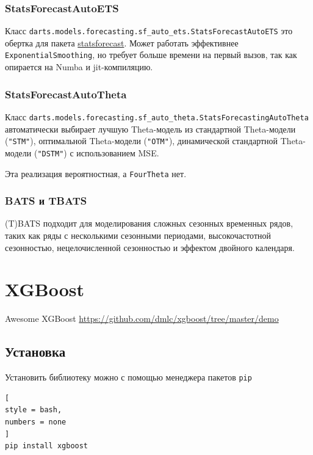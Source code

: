 \documentclass[%
	11pt,
	a4paper,
	utf8,
		]{article}
\begin{document}
\subsubsection{StatsForecastAutoETS}

Класс \verb|darts.models.forecasting.sf_auto_ets.StatsForecastAutoETS| это обертка для пакета \href{https://github.com/Nixtla/statsforecast}{statsforecast}. Может работать эффективнее \verb|ExponentialSmoothing|, но требует больше времени на первый вызов, так как опирается на Numba и jit-компиляцию.

\subsubsection{StatsForecastAutoTheta}

Класс \verb|darts.models.forecasting.sf_auto_theta.StatsForecastingAutoTheta| автоматически выбирает лучшую Theta-модель из стандартной Theta-модели (\verb|"STM"|), оптимальной Theta-модели (\verb|"OTM"|), динамической стандартной Theta-модели (\verb|"DSTM"|) с использованием MSE.

Эта реализация вероятностная, а \verb|FourTheta| нет.

\subsubsection{BATS и TBATS}

(T)BATS подходит для моделирования сложных сезонных временных рядов, таких как ряды с несколькими сезонными периодами, высокочастотной сезонностью, нецелочисленной сезонностью и эффектом двойного календаря.








\section{XGBoost}

Awesome XGBoost \url{https://github.com/dmlc/xgboost/tree/master/demo}

\subsection{Установка}

Установить библиотеку можно с помощью менеджера пакетов \verb|pip|
\begin{lstlisting}[
style = bash,
numbers = none	
]
pip install xgboost
\end{lstlisting}
\end{document}
